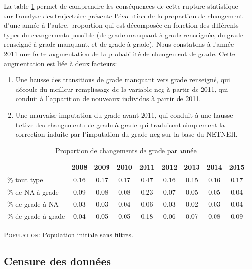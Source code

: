\documentclass[11pt,a4paper]{article}
\begin{document}
La table \ref{quality2} permet de comprendre les conséquences de cette rupture statistique sur l'analyse des trajectoire présente l'évolution de la proportion de changement d'une année à l'autre, proportion qui est décomposée en fonction des différents types de changements possible (de grade manquant à grade renseignée, de grade renseigné à grade manquant, et de grade à grade). 
Nous constatons à l'année 2011 une forte augmentation de la probabilité de changement de grade. Cette augmentation est liée à deux facteurs: 
\begin{enumerate}
\item Une hausse des transitions de grade manquant vers grade renseigné, qui découle du meilleur remplissage de la variable neg à partir de 2011, qui conduit à l'apparition de nouveaux individus à partir de 2011.  
\item Une mauvaise imputation du grade avant 2011, qui conduit à une hausse fictive des changements de grade à grade qui traduisent simplement la correction induite par l'imputation du grade neg sur la base du NETNEH. 
\end{enumerate}
 

\begin{table}[h!]
\centering
\caption{Proportion de changements de grade par année} 
\label{quality2}
\begin{tabular}{lcccccccc}
\toprule
 & 2008 & 2009 & 2010 & 2011 & 2012 & 2013 & 2014 & 2015 \\ 
  \hline
\% tout type & 0.16 & 0.17 & 0.17 & 0.47 & 0.16 & 0.15 & 0.16 & 0.17 \\ 
\midrule
  \% de NA à grade & 0.09 & 0.08 & 0.08 & 0.23 & 0.07 & 0.05 & 0.05 & 0.04 \\ 
  \% de grade à NA & 0.03 & 0.03 & 0.04 & 0.06 & 0.03 & 0.02 & 0.03 & 0.04 \\ 
  \% de grade à grade & 0.04 & 0.05 & 0.05 & 0.18 & 0.06 & 0.07 & 0.08 & 0.09 \\ 
\bottomrule
\end{tabular}
\begin{minipage}{12cm}
\footnotesize
\textsc{Population:} Population initiale sans filtres.
\end{minipage}
\end{table}







\subsection{Censure des données}
\end{document}
